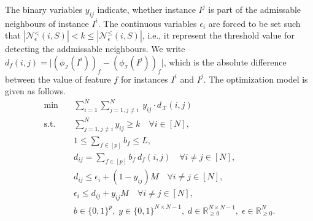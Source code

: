 \documentclass[11pt, a4paper]{article}
\newcommand{\X}{{\mathcal{X}}} %
\newcommand{\instanceindex}{i}
\newcommand{\instanceindextwo}{j}
\newcommand{\instfeatures}{[p]} %
\newcommand{\fsel}{S} %
\newcommand{\selectionset}{\fsel}
\newcommand{\soldist}[1][(\instanceindex,\instanceindextwo)]{d_\X#1} %
\newcommand{\neighbour}{\ensuremath{\mathcal{N}}}
\newcommand{\sEpsStrict}[1][(\instanceindex,\selectionset)]{\ensuremath{\neighbour^<_\epsilon#1}}
\newcommand{\sEpsNeighbour}[1][(\instanceindex,\selectionset)]{\ensuremath{\neighbour^\le_\epsilon#1}}
\begin{document}
The binary variables $y_{ij}$ indicate, whether instance $I^j$ is part of the admissable neighbours of instance $I^i$.
The continuous variables $\epsilon_i$ are forced to be set such that $|\sEpsStrict| < k \leq |\sEpsNeighbour|$, i.e., it represent the threshold value for detecting the addmissable neighbours.
We write $d_f(i,j) = \big|(\phi_{\mathcal{I}}(I^i))_f - (\phi_{\mathcal{I}}(I^j))_f\big|$, which is
the absolute difference between the value of feature $f$ for instances  $I^i$ and $I^j$. The optimization model is given as follows. 
\begin{subequations}\label{problem:optimistic_fspeo}
	\begin{align}
		\label{problem:optimistic_fspeo:obj}\min \quad &\sum_{i=1}^N \sum_{j=1,j\neq i}^N\ y_{ij}\cdot \soldist\\
		\label{problem:optimistic_fspeo:k_neighbors}\text{s.t.} \quad &\sum_{j=1, j\neq i}^N y_{ij} \ge k\quad \forall i\in [N],\\
		\label{problem:optimistic_fspeo:L_features}&1 \le \sum_{f\in\instfeatures} b_f\le L,\\
		\label{problem:optimistic_fspeo:instance_diff}&d_{ij} = \sum_{f\in\instfeatures} b_f\ d_f(i,j) \quad \forall i\neq j\in [N],\\
		\label{problem:optimistic_fspeo:neighboring1}&d_{ij} \le\epsilon_i+(1-y_{ij})M\quad \forall i\neq j\in [N],\\
		\label{problem:optimistic_fspeo:neighboring2}&\epsilon_i\le d_{ij} + y_{ij}M\quad \forall i\neq j\in [N],\\
		\label{problem:optimistic_fspeo:vardef}&b\in\{0,1\}^{p},\; y\in\{0,1\}^{N\times N-1},\; d \in \mathbb{R}^{N\times N-1}_{\geq 0},\;
	    \epsilon\in\mathbb{R}_{\ge 0}^N.
	\end{align}
\end{subequations}
\end{document}
